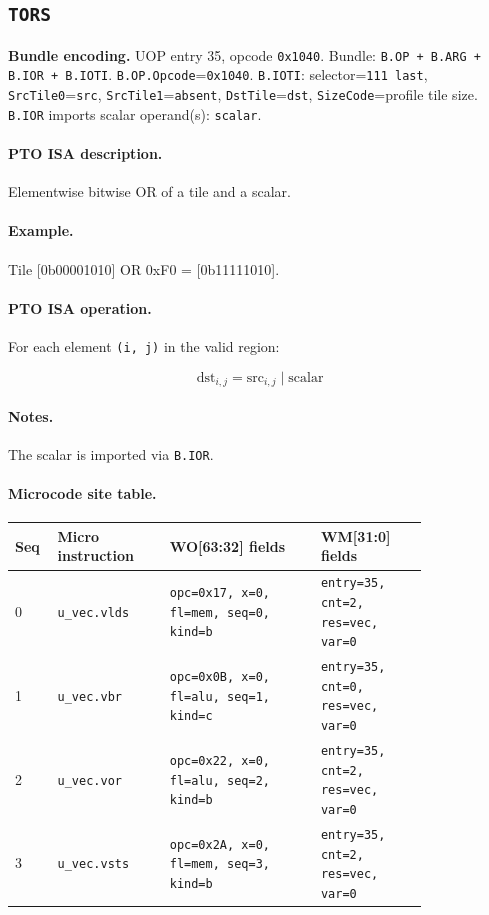 \subsection{\texttt{TORS}}
\noindent\textbf{Bundle encoding.} UOP entry 35, opcode \texttt{0x1040}. Bundle: \texttt{B.OP + B.ARG + B.IOR + B.IOTI}. \texttt{B.OP.Opcode}=\texttt{0x1040}. \texttt{B.IOTI}: selector=\texttt{111 last}, \texttt{SrcTile0}=\texttt{src}, \texttt{SrcTile1}=\texttt{absent}, \texttt{DstTile}=\texttt{dst}, \texttt{SizeCode}=profile tile size. \texttt{B.IOR} imports scalar operand(s): \texttt{scalar}.\par\smallskip
{\small
\paragraph{PTO ISA description.}
Elementwise bitwise OR of a tile and a scalar.
\paragraph{Example.}
Tile [0b00001010] OR 0xF0 = [0b11111010].
\par\smallskip
\paragraph{PTO ISA operation.}
For each element \texttt{(i, j)} in the valid region:

\[
\mathrm{dst}_{i,j} = \mathrm{src}_{i,j} \;|\; \mathrm{scalar}
\]
}\par\smallskip
\paragraph{Notes.}
The scalar is imported via \texttt{B.IOR}.
\paragraph{Microcode site table.}
{\scriptsize
\begin{longtable}{@{}R{0.055\linewidth}L{0.23\linewidth}L{0.31\linewidth}L{0.22\linewidth}@{}}
\toprule
Seq & Micro instruction & WO[63:32] fields & WM[31:0] fields \\
 & \texttt{u\_vec.vlds} & \texttt{opc=0x17, x=0, fl=mem, seq=0, kind=b} & \texttt{entry=35, cnt=2, res=vec, var=0} \\
1 & \texttt{u\_vec.vbr} & \texttt{opc=0x0B, x=0, fl=alu, seq=1, kind=c} & \texttt{entry=35, cnt=0, res=vec, var=0} \\
2 & \texttt{u\_vec.vor} & \texttt{opc=0x22, x=0, fl=alu, seq=2, kind=b} & \texttt{entry=35, cnt=2, res=vec, var=0} \\
3 & \texttt{u\_vec.vsts} & \texttt{opc=0x2A, x=0, fl=mem, seq=3, kind=b} & \texttt{entry=35, cnt=2, res=vec, var=0} \\
\bottomrule
\end{longtable}
}
